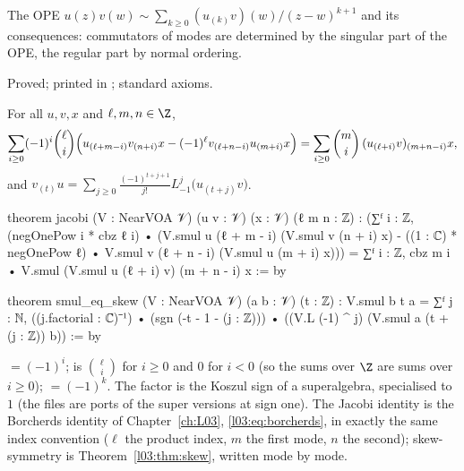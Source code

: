 \begin{physics}
The OPE $u(z)v(w)\sim\sum_{k\ge0}(u_{(k)}v)(w)/(z-w)^{k+1}$ and its consequences: commutators of modes are
determined by the singular part of the OPE, the regular part by normal ordering.
\end{physics}

\begin{status}
Proved; printed in ; standard axioms.
\end{status}

\begin{theorem}\label{ch17:thm:nearborcherds}
For all $u,v,x$ and $\ell,m,n\in\Z$,
\begin{multline*}
\sum_{i\ge0}(-1)^i\binom\ell i\Bigl(u_{(\ell+m-i)}v_{(n+i)}x-(-1)^\ell v_{(\ell+n-i)}u_{(m+i)}x\Bigr)
=\sum_{i\ge0}\binom mi\,(u_{(\ell+i)}v)_{(m+n-i)}x,
\end{multline*}
and $v_{(t)}u=\sum_{j\ge0}\frac{(-1)^{t+j+1}}{j!}L_{-1}^j\bigl(u_{(t+j)}v\bigr)$.
\end{theorem}

\begin{leancode}
theorem jacobi (V : NearVOA 𝒱) (u v : 𝒱) (x : 𝒱) (ℓ m n : ℤ) :
    (∑ᶠ i : ℤ, (negOnePow i * cbz ℓ i) •
        (V.smul u (ℓ + m - i) (V.smul v (n + i) x)
          - ((1 : ℂ) * negOnePow ℓ) • V.smul v (ℓ + n - i) (V.smul u (m + i) x)))
      = ∑ᶠ i : ℤ, cbz m i • V.smul (V.smul u (ℓ + i) v) (m + n - i) x := by

theorem smul_eq_skew (V : NearVOA 𝒱) (a b : 𝒱) (t : ℤ) :
    V.smul b t a
      = ∑ᶠ j : ℕ, ((j.factorial : ℂ)⁻¹) •
          (sgn (-t - 1 - (j : ℤ))) •
            ((V.L (-1) ^ j) (V.smul a (t + (j : ℤ)) b)) := by
\end{leancode}

\begin{dictionary}
 $=(-1)^i$;  is $\binom\ell i$ for $i\ge0$ and $0$ for $i<0$ (so the sums over $\Z$ are sums over
$i\ge0$);  $=(-1)^k$.  The factor  is the Koszul sign of a superalgebra, specialised to $1$
(the files are ports of the super versions at sign one).  The Jacobi identity is
the Borcherds identity of Chapter~\ref{ch:L03}, \eqref{l03:eq:borcherds}, in exactly the same index convention ($\ell$ the
product index, $m$ the first mode, $n$ the second); skew-symmetry is Theorem~\ref{l03:thm:skew}, written mode by mode.
\end{dictionary}

